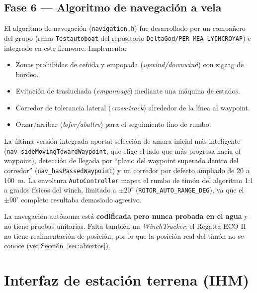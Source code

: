 \documentclass[12pt,a4paper]{article}
\newcommand{\file}[1]{\texttt{#1}}
\begin{document}
\subsection{Fase 6 --- Algoritmo de navegaci\'on a vela}

El algoritmo de navegaci\'on (\file{navigation.h}) fue desarrollado por un
compa\~nero del grupo (rama \texttt{Testautoboat} del repositorio
\texttt{DeltaGod/PER\_MEA\_LYINCROYAP}) e integrado en este firmware. Implementa:

\begin{itemize}
  \item Zonas prohibidas de ce\~nida y empopada (\emph{upwind/downwind}) con
    zigzag de bordeo.
  \item Evitaci\'on de trasluchada (\emph{empannage}) mediante una m\'aquina de
    estados.
  \item Corredor de tolerancia lateral (\emph{cross-track}) alrededor de la l\'inea
    al waypoint.
  \item Orzar/arribar (\emph{lofer/abattre}) para el seguimiento fino de rumbo.
\end{itemize}

La \'ultima versi\'on integrada aporta: selecci\'on de amura inicial m\'as
inteligente (\texttt{nav\_sideMovingTowardWaypoint}, que elige el lado que m\'as
progresa hacia el waypoint), detecci\'on de llegada por ``plano del waypoint
superado dentro del corredor'' (\texttt{nav\_hasPassedWaypoint}) y un corredor por
defecto ampliado de 20 a 100~m. La envoltura \file{AutoController} mapea el rumbo
de tim\'on del algoritmo 1:1 a grados f\'isicos del winch, limitado a
$\pm20^{\circ}$ (\texttt{ROTOR\_AUTO\_RANGE\_DEG}), ya que el $\pm90^{\circ}$ completo
resultaba demasiado agresivo.

\begin{warningbox}
  La navegaci\'on aut\'onoma est\'a \textbf{codificada pero nunca probada en el
  agua} y no tiene pruebas unitarias. Falta tambi\'en un \emph{WinchTracker}: el
  Regatta ECO II no tiene realimentaci\'on de posici\'on, por lo que la posici\'on
  real del tim\'on no se conoce (ver Secci\'on~\ref{sec:abiertos}).
\end{warningbox}

\section{Interfaz de estaci\'on terrena (IHM)}
\end{document}
